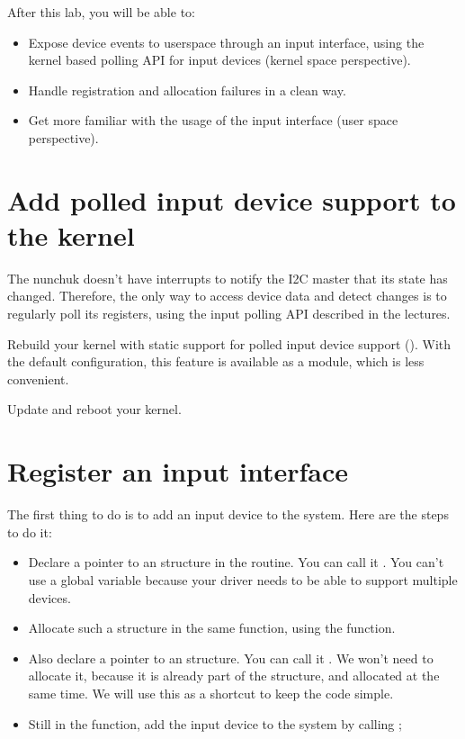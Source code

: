 
After this lab, you will be able to:

\begin{itemize}
\item Expose device events to userspace through an input interface,
      using the kernel based polling API for input devices
      (kernel space perspective).
\item Handle registration and allocation failures in a clean
      way.
\item Get more familiar with the usage of the input interface
      (user space perspective).
\end{itemize}

\section{Add polled input device support to the kernel}

The nunchuk doesn't have interrupts to notify the I2C master that 
its state has changed. Therefore, the only way to access device data
and detect changes is to regularly poll its registers, using the input
polling API described in the lectures.

Rebuild your kernel with static support for polled input device support
(). With the default configuration, this
feature is available as a module, which is less convenient.

Update and reboot your kernel.

\section{Register an input interface}

The first thing to do is to add an input device to the system. Here are
the steps to do it:

\begin{itemize}
\item Declare a pointer to an  structure in the
       routine. You can call it .
      You can't use a global variable because your driver needs to be
      able to support multiple devices.
\item Allocate such a structure in the same function, using the
       function. 
\item Also declare a pointer to an  structure. You can 
      call it . We won't need to allocate it, because it
      is already part of the  structure,
      and allocated at the same time.
      We will use this as a shortcut to keep the code simple.
\item Still in the  function, add the input device to
      the system by calling ;
\end{itemize}

